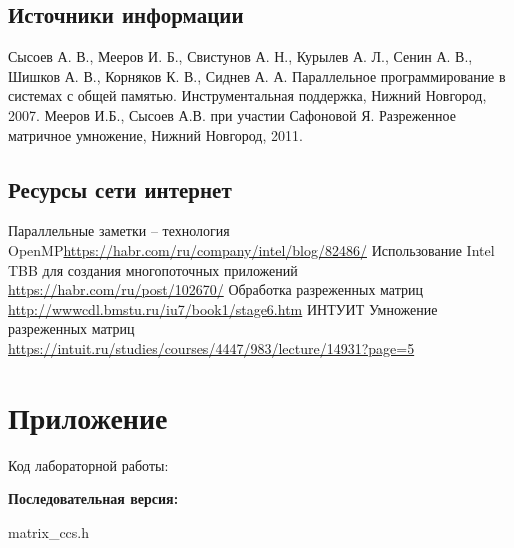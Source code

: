 \documentclass{report}
\begin{document}
\begin{thebibliography}{1}
\subsection*{Источники информации}
Сысоев А. В., Мееров И. Б., Свистунов А. Н., Курылев А. Л., Сенин А. В., Шишков А. В., Корняков К. В.,
Сиднев А. А. Параллельное программирование в системах с общей
памятью. Инструментальная поддержка, Нижний Новгород, 2007.
Мееров И.Б., Сысоев А.В. при участии Сафоновой Я. Разреженное матричное умножение, Нижний Новгород, 2011.
\subsection*{Ресурсы сети интернет}
Параллельные заметки – технология OpenMP\newline \url{https://habr.com/ru/company/intel/blog/82486/}
Использование Intel TBB для создания многопоточных приложений \newline \url{https://habr.com/ru/post/102670/}
Обработка разреженных матриц \\
\url{http://wwwcdl.bmstu.ru/iu7/book1/stage6.htm}
ИНТУИТ Умножение разреженных матриц\\
\url{https://intuit.ru/studies/courses/4447/983/lecture/14931?page=5}
\end{thebibliography}
\newpage

\section*{Приложение}
Код лабораторной работы:

\newline
\textbf{Последовательная версия:}

\newline matrix\_ccs.h
\end{document}
